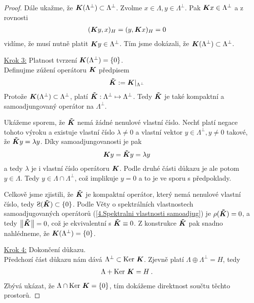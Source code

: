 \begin{proof}
Dále ukažme, že $\boldsymbol{K}(\Lambda^\bot) \subset \Lambda^\bot$. Zvolme $x \in \Lambda, y \in \Lambda^\bot$. Pak $\boldsymbol{K} x \in \Lambda^\bot$ a z rovnosti \begin{align*}
    (\boldsymbol{K} y,x)_H = (y, \boldsymbol{K} x)_H =0
\end{align*}
vidíme, že musí nutně platit $\boldsymbol{K} y \in \Lambda^\bot$. Tím jsme dokázali, že $\boldsymbol{K}(\Lambda^\bot) \subset \Lambda^{\bot}$.

\underline{Krok 3:} Platnost tvrzení $\boldsymbol{K}(\Lambda^\bot) = \lbrace 0 \rbrace$. \\
Definujme zúžení operátoru $\boldsymbol{K}$ předpisem \begin{align*}
    \boldsymbol{\tilde K} := \boldsymbol{K}|_{\Lambda^\bot}
\end{align*}
Protože $\boldsymbol{K}(\Lambda^\bot) \subset \Lambda^{\bot}$, platí $\boldsymbol{\tilde K} : \Lambda^{\bot} \mapsto \Lambda^{\bot}$. Tedy $\boldsymbol{\tilde K}$ je také kompaktní a samoadjungovaný operátor na $\Lambda^{\bot}$.

Ukážeme sporem, že $\boldsymbol{\tilde K}$ nemá žádné nenulové vlastní číslo. Nechť platí negace tohoto výroku a existuje vlastní číslo $\lambda \neq 0$ a vlastní vektor $y \in \Lambda^{\bot} , y \neq 0$ takové, že $ \boldsymbol{\tilde K} y = \lambda y$. Díky samoadjungovanosti je pak \begin{align*}
    \boldsymbol{K} y = \boldsymbol{\tilde K} y = \lambda y
\end{align*}
a tedy $\lambda$ je i vlastní číslo operátoru $\boldsymbol{K}$. Podle druhé části důkazu je ale potom $y \in \Lambda$. Tedy $y \in \Lambda \cap \Lambda^\bot$, což implikuje $y=0$ a to je ve sporu s předpoklady.

Celkově jsme zjistili, že $\boldsymbol{\tilde K}$ je kompaktní operátor, který nemá nenulové vlastní číslo, tedy $\Sp(\map{\tilde K}) \subset \{ 0 \}$. Podle Věty o spektrálních vlastnostech samoadjugovaných operátorů (\ref{4.Spektralni vlastnosti samoadjug}) je $\rho(\boldsymbol{\tilde K}) = 0$, a tedy  $\left\lVert\boldsymbol{\tilde K}\right\rVert =0$, což je ekvivalentní s $\boldsymbol{\tilde K} \equiv 0$. Z konstrukce $\boldsymbol{\tilde K}$ pak snadno nahlédneme, že $\boldsymbol{K}(\Lambda^\bot)= \{0 \}$.

\underline{Krok 4:} Dokončení důkazu. \\
Předchozí část důkazu nám dává $\Lambda^\bot \subset \operatorname{Ker}\, \boldsymbol{K}$. Zjevně platí $\Lambda \oplus \Lambda^\bot = H$, tedy \begin{align*}
    \Lambda + \operatorname{Ker}\, \boldsymbol{K} = H \:.
\end{align*}
Zbývá ukázat, že $\Lambda \cap \operatorname{Ker}\, \boldsymbol{K} = \{0 \}$, tím dokážeme direktnost součtu těchto prostorů.


\end{proof}
